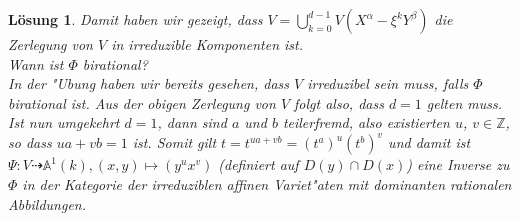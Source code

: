 \documentclass[a4paper, 12pt, numbers=noendperiod, chapterprefix=true]{scrbook}
\theoremstyle{break}
\newtheorem{Loes}{L\"osung}
\theoremstyle{nonumberbreak}
\theoremstyle{nonumberplain}
\newcommand{\Z}{\mathbb{Z}}
\newcommand{\A}{\mathbb{A}}
\newcommand{\Affine}{\mathbb{A}} %
\begin{document}
\begin{Loes}
Damit haben wir gezeigt, dass $V = \bigcup_{k=0}^{d-1} V(X^\alpha - \xi^k Y^\beta)$ die Zerlegung von $V$ in irreduzible Komponenten ist.\\

\emph{Wann ist $\Phi$ birational?}\\
In der "Ubung haben wir bereits gesehen, dass $V$ irreduzibel sein muss, falls $\Phi$ birational ist. Aus der obigen Zerlegung von $V$ folgt also, dass $d=1$ gelten muss. Ist nun umgekehrt $d=1$, dann sind $a$ und $b$ teilerfremd, also existierten $u$, $v \in \Z$, so dass $ua+vb=1$ ist. Somit gilt $t = t^{ua+vb} = (t^a)^u (t^b)^v$ und damit ist $\Psi: V \dashrightarrow \Affine^1(k), (x,y) \mapsto(y^ux^v)$ (definiert auf $D(y) \cap D(x)$) eine Inverse zu $\Phi$ in der Kategorie der irreduziblen affinen Variet"aten mit dominanten rationalen Abbildungen.
\end{Loes}
\end{document}
